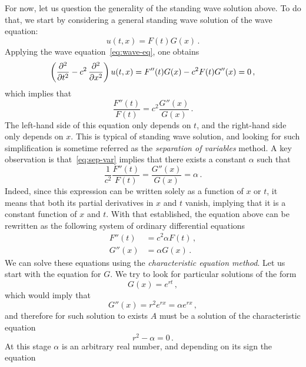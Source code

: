 For now, let us question the generality of the standing wave solution above. To do that,
we start by considering a general standing wave solution of the wave equation:
\begin{equation}
  u(t,x)=F(t)G(x)\,.
\end{equation}
Applying the wave equation~\cref{eq:wave-eq}, one obtains
\begin{equation}
  \left(\frac{\partial^{2} }{\partial t^{2}}-c^2\,\frac{\partial^{2} }{\partial x^{2}}\right)u(t,x)=F''(t)G(x)-c^2F(t)G''(x)=0\,,
\end{equation}
which implies that
\begin{equation}
  \frac{F''(t)}{F(t)}=c^2\frac{G''(x)}{G(x)}\,.\label{eq:sep-var}
\end{equation}
The left-hand side of this equation only depends on $t$, and the right-hand side only
depends on $x$. This is typical of standing wave solution, and looking for such
simplification is sometime referred as the \emph{separation of variables} method. A key
observation is that~\cref{eq:sep-var} implies that there exists a constant $\alpha$ such
that
\begin{equation}
  \frac{1}{c^2}\frac{F''(t)}{F(t)}=\frac{G''(x)}{G(x)}=\alpha\,.
\end{equation}
Indeed, since this expression can be written solely as a function of $x$ or $t$, it means
that both its partial derivatives in $x$ and $t$ vanish, implying that it is a constant
function of $x$ and $t$. With that established, the equation above can be rewritten as the
following system of ordinary differential equations
\begin{align}
  F''(t)&=c^2\alpha F(t)\,,\label{eq:sep-var-F}\\
  G''(x)&=\alpha G(x)\,.
\end{align}
We can solve these equations using the \emph{characteristic equation method}. Let us start
with the equation for $G$. We try to look for particular solutions of the form
\begin{equation}
  G(x)=e^{rt}\,,
\end{equation}
which would imply that
\begin{equation}
  G''(x)=r^2e^{rx}=\alpha e^{rx}\,,
\end{equation}
and therefore for such solution to exists $A$ must be a solution of the characteristic
equation
\begin{equation}
  r^2-\alpha=0\,.
\end{equation}
At this stage $\alpha$ is an arbitrary real number, and depending on its sign the equation

